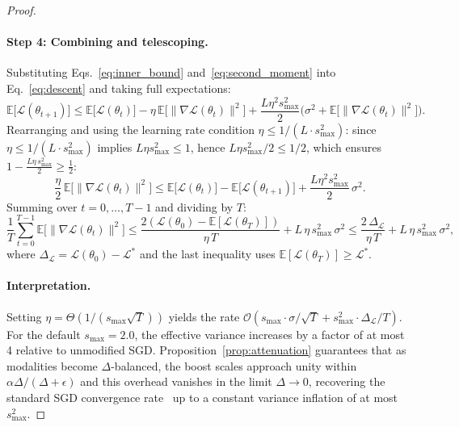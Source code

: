 \documentclass{article} %
\newcommand{\loss}{\mathcal{L}}
\begin{document}
\begin{proof}
\paragraph{Step 4: Combining and telescoping.}
Substituting Eqs.~\eqref{eq:inner_bound} and~\eqref{eq:second_moment} into Eq.~\eqref{eq:descent} and taking full expectations:
%
\begin{equation*}
\mathbb{E}\bigl[\loss(\theta_{t+1})\bigr] \leq \mathbb{E}\bigl[\loss(\theta_t)\bigr]
- \eta\,\mathbb{E}\bigl[\|\nabla \loss(\theta_t)\|^2\bigr]
+ \frac{L\eta^2 s_{\max}^2}{2}\bigl(\sigma^2 + \mathbb{E}\bigl[\|\nabla \loss(\theta_t)\|^2\bigr]\bigr).
\end{equation*}
%
Rearranging and using the learning rate condition $\eta \leq 1/(L \cdot s_{\max}^2)$: since $\eta \leq 1/(L \cdot s_{\max}^{2})$ implies $L\eta s_{\max}^{2} \leq 1$, hence $L\eta s_{\max}^{2}/2 \leq 1/2$, which ensures $1 - \tfrac{L\eta\, s_{\max}^2}{2} \geq \tfrac{1}{2}$:
%
\begin{equation*}
\frac{\eta}{2}\,\mathbb{E}\bigl[\|\nabla \loss(\theta_t)\|^2\bigr]
\leq \mathbb{E}\bigl[\loss(\theta_t)\bigr] - \mathbb{E}\bigl[\loss(\theta_{t+1})\bigr]
+ \frac{L\eta^2 s_{\max}^2}{2}\,\sigma^2.
\end{equation*}
%
Summing over $t = 0, \ldots, T-1$ and dividing by $T$:
%
\begin{equation*}
\frac{1}{T}\sum_{t=0}^{T-1} \mathbb{E}\bigl[\|\nabla \loss(\theta_t)\|^2\bigr]
\leq \frac{2(\loss(\theta_0) - \mathbb{E}[\loss(\theta_T)])}{\eta\, T}
+ L\,\eta\, s_{\max}^2\, \sigma^2
\leq \frac{2\,\Delta_{\loss}}{\eta\, T}
+ L\,\eta\, s_{\max}^2\, \sigma^2,
\end{equation*}
%
where $\Delta_{\loss} = \loss(\theta_0) - \loss^{*}$ and the last inequality uses $\mathbb{E}[\loss(\theta_T)] \geq \loss^{*}$.

\paragraph{Interpretation.} Setting $\eta = \Theta(1/(s_{\max}\sqrt{T}))$ yields the rate $\mathcal{O}(s_{\max} \cdot \sigma / \sqrt{T} + s_{\max}^2 \cdot \Delta_{\loss} / T)$. For the default $s_{\max} = 2.0$, the effective variance increases by a factor of at most 4 relative to unmodified SGD. Proposition~\ref{prop:attenuation} guarantees that as modalities become $\Delta$-balanced, the boost scales approach unity within $\alpha \Delta / (\Delta + \epsilon)$ and this overhead vanishes in the limit $\Delta \to 0$, recovering the standard SGD convergence rate~\citep{ghadimi2013sgd} up to a constant variance inflation of at most $s_{\max}^2$.
\end{proof}
\end{document}
